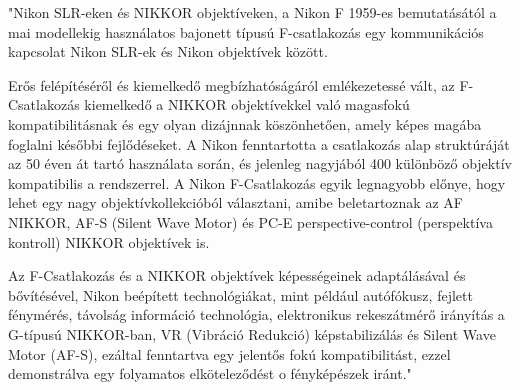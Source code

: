 
"Nikon SLR-eken és NIKKOR objektíveken, a Nikon F 1959-es bemutatásától a mai modellekig használatos bajonett típusú F-csatlakozás egy kommunikációs kapcsolat Nikon SLR-ek és Nikon objektívek között.

Erős felépítéséről és kiemelkedő megbízhatóságáról emlékezetessé vált, az F-Csatlakozás kiemelkedő a NIKKOR objektívekkel való magasfokú kompatibilitásnak és egy olyan dizájnnak köszönhetően, amely képes magába foglalni későbbi fejlődéseket. A Nikon fenntartotta a csatlakozás alap struktúráját az 50 éven át tartó használata során, és jelenleg nagyjából 400 különböző objektív kompatibilis a rendszerrel. A Nikon F-Csatlakozás egyik legnagyobb előnye, hogy lehet egy nagy objektívkollekcióból választani, amibe beletartoznak az AF NIKKOR, AF-S (Silent Wave Motor) és PC-E perspective-control (perspektíva kontroll) NIKKOR objektívek is.

Az F-Csatlakozás és a NIKKOR objektívek képességeinek adaptálásával és bővítésével, Nikon beépített technológiákat, mint például autófókusz, fejlett fénymérés, távolság információ technológia, elektronikus rekeszátmérő irányítás a G-típusú NIKKOR-ban, VR (Vibráció Redukció) képstabilizálás és Silent Wave Motor (AF-S), ezáltal fenntartva egy jelentős fokú kompatibilitást, ezzel demonstrálva egy folyamatos elköteleződést o fényképészek iránt."\cite{Nikon_F_mount-ról}




